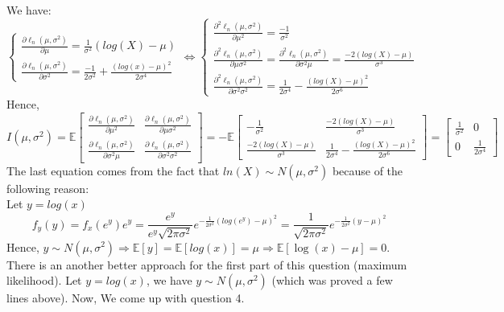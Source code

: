 \documentclass[10pt]{article}
\newenvironment{problem}[2][Problem]{\begin{trivlist}
\item[\hskip \labelsep {\bfseries #1}\hskip \labelsep {\bfseries #2.}]}{\end{trivlist}}
\begin{document}
\begin{problem}{1}
We have: 
\[ \begin{cases} \frac{\partial \ell_n(\mu, \sigma^2)}{\partial \mu} = \frac{1}{\sigma^2}(log(X) - \mu) \\\frac{\partial \ell_n(\mu, \sigma^2)}{\partial \sigma^2} = \frac{-1}{2\sigma^2} + \frac{(log(x)-\mu)^2}{2\sigma^4} \end{cases} \Leftrightarrow \begin{cases} \frac{\partial^2  \ell_n(\mu, \sigma^2)}{\partial \mu^2} = \frac{-1}{\sigma^2} \\ \frac{\partial^2  \ell_n(\mu, \sigma^2)}{\partial \mu \sigma^2}= \frac{\partial^2  \ell_n(\mu, \sigma^2)}{\partial \sigma^2 \mu}= \frac{-2(log(X)-\mu)}{\sigma^3} \\  \frac{\partial^2  \ell_n(\mu, \sigma^2)}{\partial \sigma^2 \sigma^2} = \frac{1}{2\sigma^4} - \frac{(log(X)-\mu)^2}{2\sigma^6} \end{cases}\]
Hence, 
\[ I(\mu, \sigma^2)=\mathbb{E} \begin{bmatrix}
    \frac{\partial \ell_n(\mu, \sigma^2)}{\partial \mu^2} & \frac{\partial \ell_n(\mu, \sigma^2)}{\partial \mu \sigma^2}\\
    \frac{\partial \ell_n(\mu, \sigma^2)}{\partial \sigma^2 \mu} & \frac{\partial \ell_n(\mu, \sigma^2)}{\partial \sigma^2 \sigma^2}
\end{bmatrix} = -\mathbb{E} \begin{bmatrix}
    -\frac{1}{\sigma^2} & \frac{-2(log(X)-\mu)}{\sigma^3} \\
    \frac{-2(log(X)-\mu)}{\sigma^3} & \frac{1}{2\sigma^4} - \frac{(log(X)-\mu)^2}{2\sigma^6}
\end{bmatrix}= \begin{bmatrix}
\frac{1}{\sigma^2} & 0 \\
0 & \frac{1}{2\sigma^4}
\end{bmatrix} \]
The last equation comes from the fact that $ln(X) \sim N(\mu, \sigma^2)$ because of the following reason:\\
Let $y=log(x)$ 
\[ f_{y}(y)=f_{x}(e^y)e^{y}=\frac{e^{y}}{e^{y}\sqrt{2\pi \sigma^2}} e^{-\frac{1}{2\sigma^2}(log(e^y)-\mu)^2}=\frac{1}{\sqrt{2\pi \sigma^2}}e^{-\frac{1}{2\sigma^2}(y-\mu)^2} \]
Hence, $y \sim N(\mu, \sigma^2) \Longrightarrow \mathbb{E}[y]=\mathbb{E}[log(x)]=\mu \Longrightarrow \mathbb{E}[\log(x) -\mu] = 0$.
There is an another better approach for the first part of this question (maximum likelihood). Let $y=log(x)$, we have $y\sim N(\mu, \sigma^2)$ (which was proved a few lines above). Now, We come up with question 4.\\












\end{problem}
\end{document}

